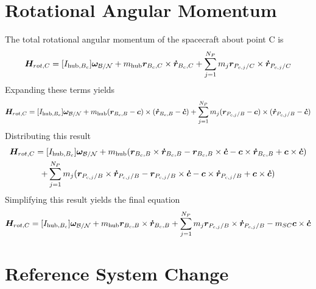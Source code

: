 \documentclass[]{BasiliskReportMemo}
\begin{document}
\section{Rotational Angular Momentum}
The total rotational angular momentum of the spacecraft about point C is
\begin{equation}
\bm{H}_{rot,C}=[I_{\text{hub},B_c}] \bm\omega_{\cal B/N}+m_{\text{hub}}\bm{r}_{B_c,C}\times\bm{\dot{r}}_{B_c,C}+\sum\limits_{j=1}^{N_P}  m_j \bm{r}_{P_{c,j}/C}\times\bm{\dot{r}}_{P_{c,j}/C}
\label{eq:RAM1}
\end{equation}
Expanding these terms yields
\begin{equation}
\bm{H}_{rot,C}=[I_{\text{hub},B_c}] \bm\omega_{\cal B/N}+m_{\text{hub}}(\bm{r}_{B_c,B}-\bm{c})\times(\bm{\dot{r}}_{B_c,B}-\bm{\dot{c}})+\sum\limits_{j=1}^{N_P}  m_j (\bm{r}_{P_{c,j}/B}-\bm{c})\times(\bm{\dot{r}}_{P_{c,j}/B}-\bm{\dot{c}})
\label{eq:RAM2}
\end{equation}
Distributing this result
\begin{multline}
\bm{H}_{rot,C}=[I_{\text{hub},B_c}] \bm\omega_{\cal B/N}+m_{\text{hub}}(\bm{r}_{B_c,B}\times\bm{\dot{r}}_{B_c,B}-\bm{r}_{B_c,B}\times\bm{\dot{c}}-\bm{c}\times\bm{\dot{r}}_{B_c,B}+\bm{c}\times\bm{\dot{c}})\\+\sum\limits_{j=1}^{N_P} m_j (\bm{r}_{P_{c,j}/B}\times\bm{\dot{r}}_{P_{c,j}/B}-\bm{r}_{P_{c,j}/B}\times\bm{\dot{c}}-\bm{c}\times\bm{\dot{r}}_{P_{c,j}/B}+\bm{c}\times\bm{\dot{c}})
\label{eq:RAM3}
\end{multline}
Simplifying this result yields the final equation
\begin{equation}
\bm{H}_{rot,C}=[I_{\text{hub},B_c}] \bm\omega_{\cal B/N}+m_{\text{hub}}\bm{r}_{B_c,B}\times\bm{\dot{r}}_{B_c,B}+\sum\limits_{j=1}^{N_P} m_j \bm{r}_{P_{c,j}/B}\times\bm{\dot{r}}_{P_{c,j}/B}-m_{SC}\bm{c}\times\bm{\dot{c}}
\label{eq:RAM4}
\end{equation}
\section{Reference System Change}
\end{document}
